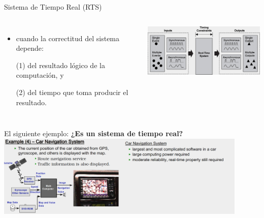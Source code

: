 \documentclass[8pt,aspectratio=169,compress]{beamer}
\begin{document}
\begin{frame}{Sistema de Tiempo Real (RTS)}

   \begin{columns}[onlytextwidth,T]
     \column{\dimexpr\linewidth-70mm-5mm}

\begin{itemize}
  \item[RTS] cuando la correctitud del sistema depende:

\bigskip
(1) del resultado lógico de la computación, y

\bigskip
(2) del tiempo que toma producir el resultado.

\end{itemize}

      \column{70mm}
    \includegraphics[width=70mm]{images/rts.jpg}

    \end{columns}
\bigskip
El siguiente ejemplo: \textbf{¿Es un sistema de tiempo real?}
\bigskip
    \includegraphics[width=120mm]{images/ejemplo4.jpg}

\end{frame}
\end{document}
